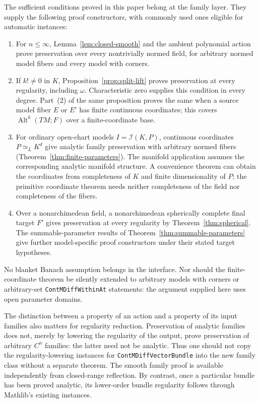 \documentclass[11pt]{amsart}
\theoremstyle{definition}
\theoremstyle{remark}
\numberwithin{equation}{section}
\newcommand{\Alt}{\operatorname{Alt}}
\begin{document}
The sufficient conditions proved in this paper belong at the family layer. They supply the
following proof constructors, with commonly used ones eligible for automatic instances:
\begin{enumerate}
\item For $n\le\infty$, Lemma~\ref{lem:closed-smooth} and the ambient polynomial action prove
preservation over every nontrivially normed field, for arbitrary normed model fibers and every
model with corners.
\item If $k!\ne0$ in $K$, Proposition~\ref{prop:split-lift} proves preservation at every regularity,
including $\omega$. Characteristic zero supplies this condition in every degree. Part~(2) of the same proposition proves the same when a source model fiber $E$ or $E'$ has finite continuous coordinates; this covers $\Alt^k(TM;F)$ over a finite-coordinate base.
\item For ordinary open-chart models $I=\mathcal I(K,P)$, continuous coordinates
$P\simeq_L K^d$ give analytic family preservation with arbitrary normed fibers
(Theorem~\ref{thm:finite-parameters}). The manifold application assumes the corresponding analytic
manifold structure. A convenience theorem can obtain the coordinates from completeness of $K$
and finite dimensionality of $P$; the primitive coordinate theorem needs neither completeness of
the field nor completeness of the fibers.
\item Over a nonarchimedean field, a nonarchimedean spherically complete final target $F'$ gives
preservation at every regularity by Theorem~\ref{thm:spherical}. The summable-parameter results of
Theorem~\ref{thm:summable-parameters} give further model-specific proof constructors under their
stated target hypotheses.
\end{enumerate}
No blanket Banach assumption belongs in the interface. Nor should the finite-coordinate theorem
be silently extended to arbitrary models with corners or arbitrary-set
\texttt{ContMDiffWithinAt} statements: the argument supplied here uses open parameter domains.

The distinction between a property of an action and a property of its input families also matters
for regularity reduction. Preservation of analytic families does not, merely by lowering the
regularity of the output, prove preservation of arbitrary $C^n$ families: the latter need not be
analytic. Thus one should not copy the regularity-lowering instances for
\texttt{ContMDiffVectorBundle} into the new family class without a separate theorem.
The smooth family proof is available independently from closed-range reflection. By contrast,
once a particular bundle has been proved analytic, its lower-order bundle regularity follows
through Mathlib's existing instances.
\end{document}
